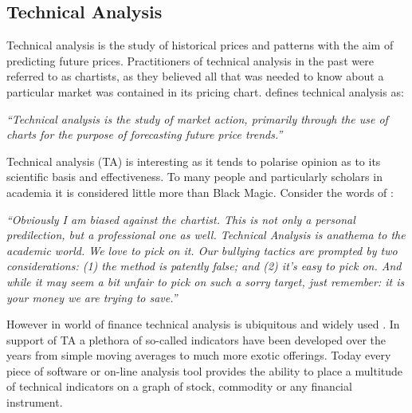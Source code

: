
\subsection{Technical Analysis}
\label{chp1:ta}
Technical analysis is the study of historical prices and patterns with the aim of predicting future prices. Practitioners of technical analysis in the past were referred to as chartists, as they believed all that was needed to know about a particular market was contained in its pricing chart. \cite{murphy1999technical} defines technical analysis as:


\textit{\textquotedblleft Technical analysis is the study of market action, primarily through the use of charts for the purpose of forecasting future price trends.\textquotedblright}

Technical analysis (TA) is interesting as it tends to polarise opinion as to its scientific basis and effectiveness. To many people and particularly scholars in academia it is considered little more than Black Magic. Consider the words of \cite{malkiel1999random}:

\textit{\textquotedblleft Obviously I am biased against the chartist. This is not only a personal predilection, but a professional one as well. Technical Analysis is anathema to the academic world. We love to pick on it. Our bullying tactics are prompted by two considerations: (1) the method is patently false; and (2) it's easy to pick on. And while it may seem a bit unfair to pick on such a sorry target, just remember: it is your money we are trying to save.\textquotedblright}

However in world of finance technical analysis is ubiquitous and widely used \cite{Menkhoff20102573}. In support of TA a plethora of so-called indicators have been developed over the years from simple moving averages to much more exotic offerings. Today every piece of software or on-line analysis tool provides the ability to place a multitude of technical indicators on a graph of stock, commodity or any financial instrument.

